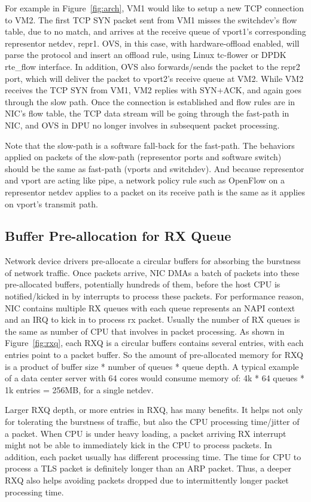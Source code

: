 \documentclass[letterpaper]{article}
\begin{document}
For example in Figure~\ref{fig:arch}, VM1 would like to setup a new TCP
connection to VM2. The first TCP SYN packet sent from VM1 misses the
switchdev's flow table, due to no match, and arrives at the receive
queue of vport1's corresponding representor netdev, repr1.
OVS, in this case, with hardware-offload enabled, will parse the protocol
and insert an offload rule, using Linux tc-flower or DPDK rte\_flow interface.
In addition, OVS also forwards/sends the packet to the repr2 port, which
will deliver the packet to vport2's receive queue at VM2.
While VM2 receives the TCP SYN from VM1, VM2 replies with SYN+ACK, and
again goes through the slow path. Once the connection is established
and flow rules are in NIC's flow table, the TCP data stream will be
going through the fast-path in NIC, and OVS in DPU no longer involves
in subsequent packet processing.

Note that the slow-path is a software fall-back for the fast-path.
The behaviors applied on packets of the slow-path (representor ports and software
switch) should be the same as fast-path (vports and switchdev).
And because representor and vport are acting like pipe, a network policy
rule such as OpenFlow on a representor netdev applies to a packet on its
receive path is the same as it applies on vport's transmit path.

\subsection{Buffer Pre-allocation for RX Queue}
Network device drivers pre-allocate a circular buffers for absorbing the
burstness of network traffic.
Once packets arrive, NIC DMAs a batch of packets into these pre-allocated buffers,
potentially hundreds of them, before the host CPU is notified/kicked in
by interrupts to process these packets.
For performance reason, NIC contains multiple RX queues with each queue
represents an NAPI context and an IRQ to kick in to process rx packet.
Usually the number of RX queues is the same as number of CPU that involves
in packet processing.
As shown in Figure~\ref{fig:rxq}, each RXQ is a circular buffers
contains several entries, with each entries
point to a packet buffer. So the amount of pre-allocated memory for RXQ
is a product of buffer size * number of queues * queue depth.
A typical example of a data center server with 64 cores would consume memory of:
4k * 64 queues * 1k entries = 256MB, for a single netdev.

Larger RXQ depth, or more entries in RXQ, has many benefits.
It helps not only for tolerating the burstness of traffic, but also
the CPU processing time/jitter of a packet. When CPU is under heavy loading,
a packet arriving RX interrupt might not be able to immediately
kick in the CPU to process packets.
In addition, each packet usually has different processing time.
The time for CPU to process a TLS packet is definitely longer than
an ARP packet. Thus, a deeper RXQ also helps avoiding packets
dropped due to intermittently longer packet processing time.
\end{document}
